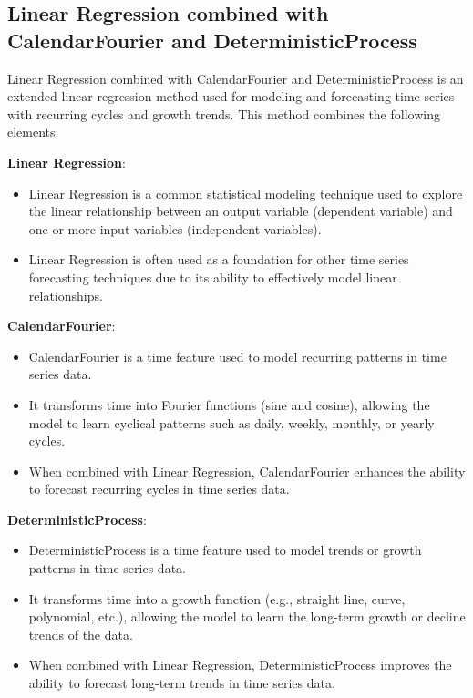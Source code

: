 \documentclass{ieeeojies}
\begin{document}
\subsection{Linear Regression combined with CalendarFourier and DeterministicProcess }

Linear Regression combined with CalendarFourier and DeterministicProcess is an extended linear regression method used for modeling and forecasting time series with recurring cycles and growth trends. This method combines the following elements: 

\textbf{Linear Regression}:

\begin{itemize}
    \item Linear Regression is a common statistical modeling technique used to explore the linear relationship between an output variable (dependent variable) and one or more input variables (independent variables).
    \item Linear Regression is often used as a foundation for other time series forecasting techniques due to its ability to effectively model linear relationships.
\end{itemize}
\textbf{CalendarFourier}:

\begin{itemize}
    \item CalendarFourier is a time feature used to model recurring patterns in time series data.
    \item It transforms time into Fourier functions (sine and cosine), allowing the model to learn cyclical patterns such as daily, weekly, monthly, or yearly cycles.
    \item When combined with Linear Regression, CalendarFourier enhances the ability to forecast recurring cycles in time series data.
\end{itemize}
\textbf{DeterministicProcess}:

\begin{itemize}
    \item DeterministicProcess is a time feature used to model trends or growth patterns in time series data.
    \item It transforms time into a growth function (e.g., straight line, curve, polynomial, etc.), allowing the model to learn the long-term growth or decline trends of the data.
    \item When combined with Linear Regression, DeterministicProcess improves the ability to forecast long-term trends in time series data.
\end{itemize}
 
\end{document}
